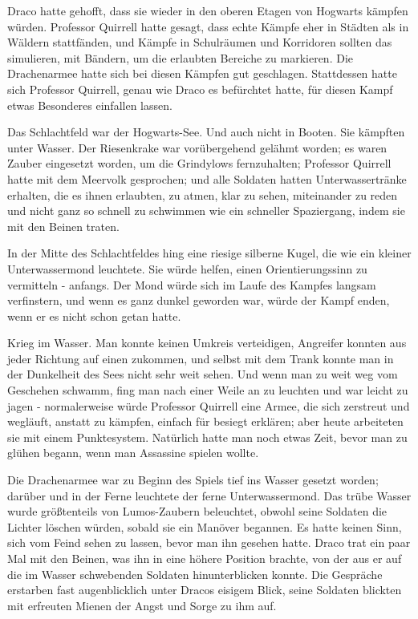 Draco hatte gehofft, dass sie wieder in den oberen Etagen von Hogwarts kämpfen
würden. Professor Quirrell hatte gesagt, dass echte Kämpfe eher in Städten als
in Wäldern stattfänden, und Kämpfe in Schulräumen und Korridoren sollten das
simulieren, mit Bändern, um die erlaubten Bereiche zu markieren. Die
Drachenarmee hatte sich bei diesen Kämpfen gut geschlagen. Stattdessen hatte
sich Professor Quirrell, genau wie Draco es befürchtet hatte, für diesen Kampf
etwas Besonderes einfallen lassen.

Das Schlachtfeld war der Hogwarts-See. Und auch nicht in Booten. Sie kämpften
unter Wasser. Der Riesenkrake war vorübergehend gelähmt worden; es waren Zauber
eingesetzt worden, um die Grindylows fernzuhalten; Professor Quirrell hatte mit
dem Meervolk gesprochen; und alle Soldaten hatten Unterwassertränke erhalten,
die es ihnen erlaubten, zu atmen, klar zu sehen, miteinander zu reden und nicht
ganz so schnell zu schwimmen wie ein schneller Spaziergang, indem sie mit den
Beinen traten.

In der Mitte des Schlachtfeldes hing eine riesige silberne Kugel, die wie ein
kleiner Unterwassermond leuchtete. Sie würde helfen, einen Orientierungssinn zu
vermitteln - anfangs. Der Mond würde sich im Laufe des Kampfes langsam
verfinstern, und wenn es ganz dunkel geworden war, würde der Kampf enden, wenn
er es nicht schon getan hatte.

Krieg im Wasser. Man konnte keinen Umkreis verteidigen, Angreifer konnten aus
jeder Richtung auf einen zukommen, und selbst mit dem Trank konnte man in der
Dunkelheit des Sees nicht sehr weit sehen. Und wenn man zu weit weg vom
Geschehen schwamm, fing man nach einer Weile an zu leuchten und war leicht zu
jagen - normalerweise würde Professor Quirrell eine Armee, die sich zerstreut
und wegläuft, anstatt zu kämpfen, einfach für besiegt erklären; aber heute
arbeiteten sie mit einem Punktesystem. Natürlich hatte man noch etwas Zeit,
bevor man zu glühen begann, wenn man Assassine spielen wollte.

Die Drachenarmee war zu Beginn des Spiels tief ins Wasser gesetzt worden;
darüber und in der Ferne leuchtete der ferne Unterwassermond. Das trübe Wasser
wurde größtenteils von Lumos-Zaubern beleuchtet, obwohl seine Soldaten die
Lichter löschen würden, sobald sie ein Manöver begannen. Es hatte keinen Sinn,
sich vom Feind sehen zu lassen, bevor man ihn gesehen hatte. Draco trat ein paar
Mal mit den Beinen, was ihn in eine höhere Position brachte, von der aus er auf
die im Wasser schwebenden Soldaten hinunterblicken konnte. Die Gespräche
erstarben fast augenblicklich unter Dracos eisigem Blick, seine Soldaten
blickten mit erfreuten Mienen der Angst und Sorge zu ihm auf.

